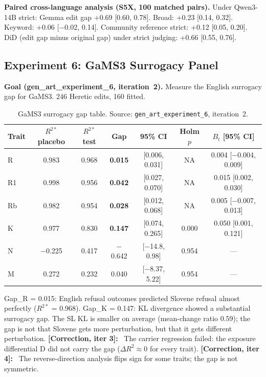 \documentclass[11pt,letterpaper]{article}
\newcommand{\corr}[1]{\noindent\textbf{[Correction, iter #1]:}~}
\begin{document}
\textbf{Paired cross-language analysis (S5X, 100 matched pairs).} Under Qwen3-14B strict: Gemma edit gap +0.69 [0.60, 0.78]. Broad: +0.23 [0.14, 0.32]. Keyword: +0.06 [$-$0.02, 0.14]. Community reference strict: +0.12 [0.05, 0.20]. DiD (edit gap minus original gap) under strict judging: +0.66 [0.55, 0.76].


\subsection{Experiment 6: GaMS3 Surrogacy Panel}\label{sec:exp6}

\textbf{Goal (gen\_art\_experiment\_6, iteration~2).} Measure the English surrogacy gap for GaMS3. 246 Heretic edits, 160 fitted.

\begin{table}[!htbp]
\centering
\caption{GaMS3 surrogacy gap table. Source: \texttt{gen\_art\_experiment\_6}, iteration~2.}
\label{tab:exp6_gap}
\small
\begin{tabular}{lcccccc}
\toprule
Trait & $R^{2*}$ placebo & $R^{2*}$ test & Gap & 95\% CI & Holm $p$ & $B_t$ [95\% CI] \\
\midrule
R & 0.983 & 0.968 & \textbf{0.015} & [0.006, 0.031] & NA & 0.004 [$-$0.004, 0.009] \\
R1 & 0.998 & 0.956 & \textbf{0.042} & [0.027, 0.070] & NA & 0.015 [0.002, 0.030] \\
Rb & 0.982 & 0.954 & \textbf{0.028} & [0.012, 0.068] & NA & 0.005 [$-$0.007, 0.013] \\
K & 0.977 & 0.830 & \textbf{0.147} & [0.074, 0.265] & 0.000 & 0.050 [0.001, 0.121] \\
N & $-$0.225 & 0.417 & $-$0.642 & [$-$14.8, 0.98] & 0.954 & --- \\
M & 0.272 & 0.232 & 0.040 & [$-$8.37, 5.22] & 0.954 & --- \\
\bottomrule
\end{tabular}
\end{table}

Gap\_R = 0.015: English refusal outcomes predicted Slovene refusal almost perfectly ($R^{2*}$ = 0.968). Gap\_K = 0.147: KL divergence showed a substantial surrogacy gap. The SL KL is smaller on average (mean-change ratio 0.59); the gap is not that Slovene gets more perturbation, but that it gets different perturbation. \corr{3} The carrier regression failed: the exposure differential D did not carry the gap ($\Delta R^2 \approx 0$ for every trait). \corr{4} The reverse-direction analysis flips sign for some traits; the gap is not symmetric.
\end{document}
